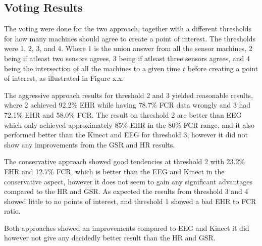 \subsection{Voting Results}

The voting were done for the two approach, together with a different thresholds for how many machines should agree to create a point of interest.
The thresholds were 1, 2, 3, and 4. Where 1 is the union answer from all the sensor machines, 2 being if atleast two sensors agrees, 3 being if atleast three sensors agrees, and 4 being the intersection of all the machines to a given time $t$ before creating a point of interest, as illustrated in Figure x.x.

The aggressive approach results for threshold 2 and 3 yielded reasonable results, where 2 achieved 92.2\% EHR while having 78.7\% FCR data wrongly and 3 had 72.1\% EHR and 58.0\% FCR. The result on threshold 2 are better than EEG which only achieved approximately 85\% EHR in the 80\% FCR range, and it also performed better than the Kinect and EEG for threshold 3, however it did not show any improvements from the GSR and HR results.

The conservative approach showed good tendencies at threshold 2 with 23.2\% EHR and 12.7\% FCR, which is better than the EEG and Kinect in the conservative aspect, however it does not seem to gain any significant advantages compared to the HR and GSR.
As expected the results from threshold 3 and 4 showed little to no points of interest, and threshold 1 showed a bad EHR to FCR ratio. 

Both approaches showed an improvements compared to EEG and Kinect it did however not give any decidedly better result than the HR and GSR. 

